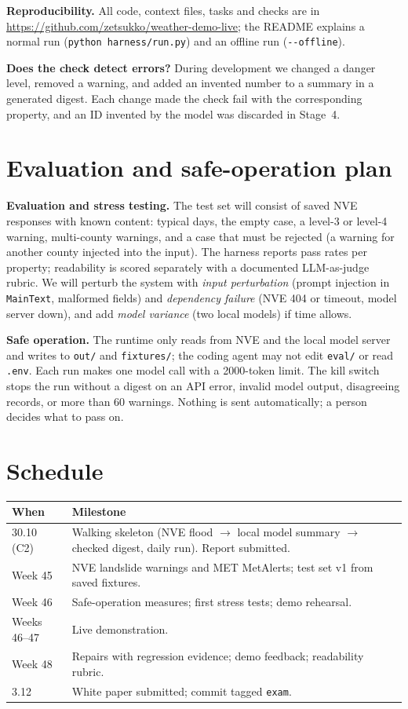 \documentclass{article}
\newcommand{\code}[1]{\texttt{#1}}
\begin{document}
\textbf{Reproducibility.} All code, context files, tasks and checks are in \url{https://github.com/zetsukko/weather-demo-live}; the README explains a normal run (\code{python harness/run.py}) and an offline run (\code{-{}-offline}).

\textbf{Does the check detect errors?} During development we changed a danger level, removed a warning, and added an invented number to a summary in a generated digest. Each change made the check fail with the corresponding property, and an ID invented by the model was discarded in Stage~4.

\section{Evaluation and safe-operation plan}

\textbf{Evaluation and stress testing.} The test set will consist of saved NVE responses with known content: typical days, the empty case, a level-3 or level-4 warning, multi-county warnings, and a case that must be rejected (a warning for another county injected into the input). The harness reports pass rates per property; readability is scored separately with a documented LLM-as-judge rubric. We will perturb the system with \emph{input perturbation} (prompt injection in \code{MainText}, malformed fields) and \emph{dependency failure} (NVE 404 or timeout, model server down), and add \emph{model variance} (two local models) if time allows.

\textbf{Safe operation.} The runtime only reads from NVE and the local model server and writes to \code{out/} and \code{fixtures/}; the coding agent may not edit \code{eval/} or read \code{.env}. Each run makes one model call with a 2000-token limit. The kill switch stops the run without a digest on an API error, invalid model output, disagreeing records, or more than 60 warnings. Nothing is sent automatically; a person decides what to pass on.

\section{Schedule}


\begin{table}[H]
\centering
\small
\begin{tabularx}{\textwidth}{@{}lX@{}}
\toprule
\textbf{When} & \textbf{Milestone} \\
\midrule
30.10 (C2) & Walking skeleton (NVE flood $\rightarrow$ local model summary $\rightarrow$ checked digest, daily run). Report submitted. \\
Week 45 & NVE landslide warnings and MET MetAlerts; test set v1 from saved fixtures. \\
Week 46 & Safe-operation measures; first stress tests; demo rehearsal. \\
Weeks 46--47 & Live demonstration. \\
Week 48 & Repairs with regression evidence; demo feedback; readability rubric. \\
3.12 & White paper submitted; commit tagged \code{exam}. \\
\bottomrule
\end{tabularx}
\end{table}
\end{document}
